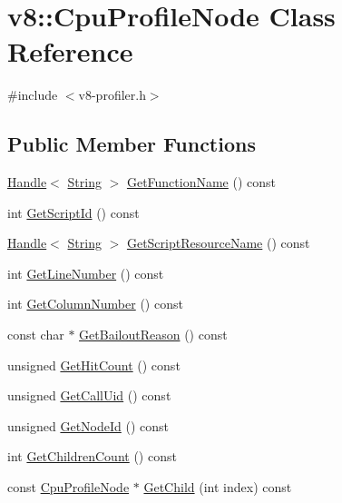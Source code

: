 \hypertarget{classv8_1_1CpuProfileNode}{\section{v8\-:\-:Cpu\-Profile\-Node Class Reference}
\label{classv8_1_1CpuProfileNode}
}


{\ttfamily \#include $<$v8-\/profiler.\-h$>$}

\subsection*{Public Member Functions}
\begin{DoxyCompactItemize}
\item 
\hyperlink{classv8_1_1Handle}{Handle}$<$ \hyperlink{classv8_1_1String}{String} $>$ \hyperlink{classv8_1_1CpuProfileNode_affbc7842b66986012285602ab65aa5f8}{Get\-Function\-Name} () const 
\item 
int \hyperlink{classv8_1_1CpuProfileNode_acf6f384df08ec40ff306d3e229f77258}{Get\-Script\-Id} () const 
\item 
\hyperlink{classv8_1_1Handle}{Handle}$<$ \hyperlink{classv8_1_1String}{String} $>$ \hyperlink{classv8_1_1CpuProfileNode_a140dd536e7096701a36be0083c18c268}{Get\-Script\-Resource\-Name} () const 
\item 
int \hyperlink{classv8_1_1CpuProfileNode_a45ea035661c7152e4f3eb47f73787a75}{Get\-Line\-Number} () const 
\item 
int \hyperlink{classv8_1_1CpuProfileNode_a43cf237ea6f254a61a6e2a81d554aa1a}{Get\-Column\-Number} () const 
\item 
const char $\ast$ \hyperlink{classv8_1_1CpuProfileNode_a16cd3d8d7ef307784838a35022507031}{Get\-Bailout\-Reason} () const 
\item 
unsigned \hyperlink{classv8_1_1CpuProfileNode_a8d297f185b0bbd9f6853f6ed193b656e}{Get\-Hit\-Count} () const 
\item 
unsigned \hyperlink{classv8_1_1CpuProfileNode_a245092eb223b948fc9441664d9e2701e}{Get\-Call\-Uid} () const 
\item 
unsigned \hyperlink{classv8_1_1CpuProfileNode_ae2971c5003353a984ef72b6cddf5e298}{Get\-Node\-Id} () const 
\item 
int \hyperlink{classv8_1_1CpuProfileNode_ac4612b91e43a2901ac20c3705288955b}{Get\-Children\-Count} () const 
\item 
const \hyperlink{classv8_1_1CpuProfileNode}{Cpu\-Profile\-Node} $\ast$ \hyperlink{classv8_1_1CpuProfileNode_aa397db1e0f5147155164c5ea3e854d69}{Get\-Child} (int index) const 
\end{DoxyCompactItemize}
